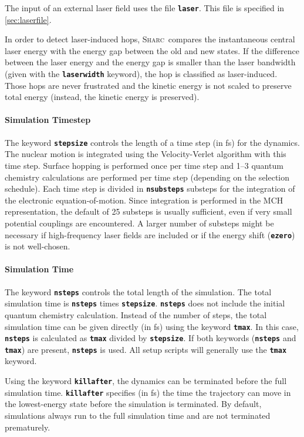 \documentclass[a4paper,10pt,DIV=15,openany,twoside=false]{scrbook}
\newcommand{\sharc}{\textsc{Sharc}}
\newcommand{\ttt}[1]{\textbf{\texttt{#1}}}
\begin{document}
The input of an external laser field uses the file \ttt{laser}. This file is specified in \ref{sec:laserfile}.

In order to detect laser-induced hops, \sharc\ compares the instantaneous central laser energy with the energy gap between the old and new states. If the difference between the laser energy and the energy gap is smaller than the laser bandwidth (given with the \ttt{laserwidth} keyword), the hop is classified as laser-induced. Those hops are never frustrated and the kinetic energy is not scaled to preserve total energy (instead, the kinetic energy is preserved).

\paragraph{Simulation Timestep}

The keyword \ttt{stepsize} controls the length of a time step (in fs) for the dynamics. The nuclear motion is integrated using the Velocity-Verlet algorithm with this time step. Surface hopping is performed once per time step and 1--3 quantum chemistry calculations are performed per time step (depending on the selection schedule). Each time step is divided in \ttt{nsubsteps} substeps for the integration of the electronic equation-of-motion. Since integration is performed in the MCH representation, the default of 25 substeps is usually sufficient, even if very small potential couplings are encountered. A larger number of substeps might be necessary if high-frequency laser fields are included or if the energy shift (\ttt{ezero}) is not well-chosen.

\paragraph{Simulation Time}

The keyword \ttt{nsteps} controls the total length of the simulation. The total simulation time is \ttt{nsteps} times \ttt{stepsize}. \ttt{nsteps} does not include the initial quantum chemistry calculation. Instead of the number of steps, the total simulation time can be given directly (in fs) using the keyword \ttt{tmax}. In this case, \ttt{nsteps} is calculated as \ttt{tmax} divided by \ttt{stepsize}. If both keywords (\ttt{nsteps} and \ttt{tmax}) are present, \ttt{nsteps} is used. All setup scripts will generally use the \ttt{tmax} keyword.

Using the keyword \ttt{killafter}, the dynamics can be terminated before the full simulation time. \ttt{killafter} specifies (in fs) the time the trajectory can move in the lowest-energy state before the simulation is terminated. By default, simulations always run to the full simulation time and are not terminated prematurely.
\end{document}
